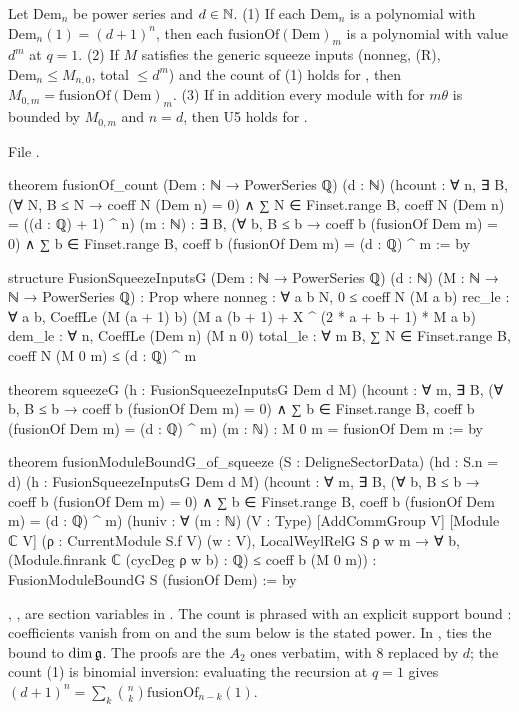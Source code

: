 \begin{theorem}\label{l26:thm:squeezeG}
Let $\mathrm{Dem}_n$ be power series and $d\in{\mathbb{N}}$. (1) If each $\mathrm{Dem}_n$ is a polynomial with $\mathrm{Dem}_n(1)=(d+1)^n$,
then each $\mathrm{fusionOf}(\mathrm{Dem})_m$ is a polynomial with value $d^m$ at $q=1$. (2) If $M$ satisfies the generic squeeze
inputs (nonneg, (R), $\mathrm{Dem}_n\le M_{n,0}$, total $\le d^m$) and the count of (1) holds for , then
$M_{0,m}=\mathrm{fusionOf}(\mathrm{Dem})_m$. (3) If in addition every module with  for $m\theta$ is bounded by
$M_{0,m}$ and $n=d$, then U5 holds for .
\end{theorem}
\noindent File .
\begin{leancode}
theorem fusionOf_count (Dem : ℕ → PowerSeries ℚ) (d : ℕ)
    (hcount : ∀ n, ∃ B, (∀ N, B ≤ N → coeff N (Dem n) = 0) ∧
      ∑ N ∈ Finset.range B, coeff N (Dem n) = ((d : ℚ) + 1) ^ n) (m : ℕ) :
    ∃ B, (∀ b, B ≤ b → coeff b (fusionOf Dem m) = 0) ∧
      ∑ b ∈ Finset.range B, coeff b (fusionOf Dem m) = (d : ℚ) ^ m := by

structure FusionSqueezeInputsG (Dem : ℕ → PowerSeries ℚ) (d : ℕ) (M : ℕ → ℕ → PowerSeries ℚ) :
    Prop where
  nonneg : ∀ a b N, 0 ≤ coeff N (M a b)
  rec_le : ∀ a b, CoeffLe (M (a + 1) b) (M a (b + 1) + X ^ (2 * a + b + 1) * M a b)
  dem_le : ∀ n, CoeffLe (Dem n) (M n 0)
  total_le : ∀ m B, ∑ N ∈ Finset.range B, coeff N (M 0 m) ≤ (d : ℚ) ^ m

theorem squeezeG (h : FusionSqueezeInputsG Dem d M)
    (hcount : ∀ m, ∃ B, (∀ b, B ≤ b → coeff b (fusionOf Dem m) = 0) ∧
      ∑ b ∈ Finset.range B, coeff b (fusionOf Dem m) = (d : ℚ) ^ m) (m : ℕ) :
    M 0 m = fusionOf Dem m := by

theorem fusionModuleBoundG_of_squeeze (S : DeligneSectorData) (hd : S.n = d)
    (h : FusionSqueezeInputsG Dem d M)
    (hcount : ∀ m, ∃ B, (∀ b, B ≤ b → coeff b (fusionOf Dem m) = 0) ∧
      ∑ b ∈ Finset.range B, coeff b (fusionOf Dem m) = (d : ℚ) ^ m)
    (huniv : ∀ (m : ℕ) (V : Type) [AddCommGroup V] [Module ℂ V] (ρ : CurrentModule S.f V) (w : V),
      LocalWeylRelG S ρ w m → ∀ b, (Module.finrank ℂ (cycDeg ρ w b) : ℚ) ≤ coeff b (M 0 m)) :
    FusionModuleBoundG S (fusionOf Dem) := by
\end{leancode}

\begin{dictionary}
, ,  are section variables in . The count is phrased with an explicit support bound
: coefficients vanish from  on and the sum below  is the stated power. In ,
 ties the bound to $\dim\mathfrak g$. The proofs are the $A_2$ ones verbatim, with $8$ replaced by $d$; the
count (1) is binomial inversion: evaluating the recursion at $q=1$ gives $(d+1)^n=\sum_k\binom nk\mathrm{fusionOf}_{n-k}(1)$.
\end{dictionary}

